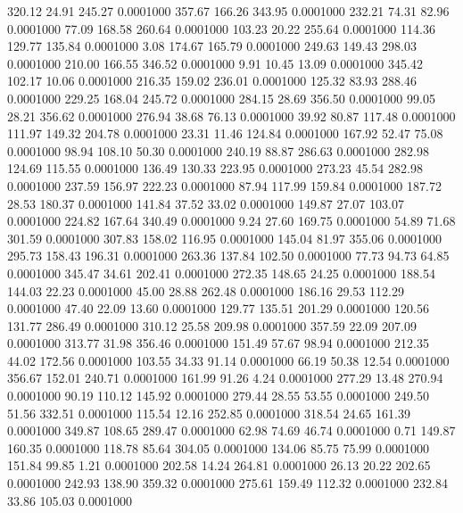  320.12   24.91  245.27   0.0001000
 357.67  166.26  343.95   0.0001000
 232.21   74.31   82.96   0.0001000
  77.09  168.58  260.64   0.0001000
 103.23   20.22  255.64   0.0001000
 114.36  129.77  135.84   0.0001000
   3.08  174.67  165.79   0.0001000
 249.63  149.43  298.03   0.0001000
 210.00  166.55  346.52   0.0001000
   9.91   10.45   13.09   0.0001000
 345.42  102.17   10.06   0.0001000
 216.35  159.02  236.01   0.0001000
 125.32   83.93  288.46   0.0001000
 229.25  168.04  245.72   0.0001000
 284.15   28.69  356.50   0.0001000
  99.05   28.21  356.62   0.0001000
 276.94   38.68   76.13   0.0001000
  39.92   80.87  117.48   0.0001000
 111.97  149.32  204.78   0.0001000
  23.31   11.46  124.84   0.0001000
 167.92   52.47   75.08   0.0001000
  98.94  108.10   50.30   0.0001000
 240.19   88.87  286.63   0.0001000
 282.98  124.69  115.55   0.0001000
 136.49  130.33  223.95   0.0001000
 273.23   45.54  282.98   0.0001000
 237.59  156.97  222.23   0.0001000
  87.94  117.99  159.84   0.0001000
 187.72   28.53  180.37   0.0001000
 141.84   37.52   33.02   0.0001000
 149.87   27.07  103.07   0.0001000
 224.82  167.64  340.49   0.0001000
   9.24   27.60  169.75   0.0001000
  54.89   71.68  301.59   0.0001000
 307.83  158.02  116.95   0.0001000
 145.04   81.97  355.06   0.0001000
 295.73  158.43  196.31   0.0001000
 263.36  137.84  102.50   0.0001000
  77.73   94.73   64.85   0.0001000
 345.47   34.61  202.41   0.0001000
 272.35  148.65   24.25   0.0001000
 188.54  144.03   22.23   0.0001000
  45.00   28.88  262.48   0.0001000
 186.16   29.53  112.29   0.0001000
  47.40   22.09   13.60   0.0001000
 129.77  135.51  201.29   0.0001000
 120.56  131.77  286.49   0.0001000
 310.12   25.58  209.98   0.0001000
 357.59   22.09  207.09   0.0001000
 313.77   31.98  356.46   0.0001000
 151.49   57.67   98.94   0.0001000
 212.35   44.02  172.56   0.0001000
 103.55   34.33   91.14   0.0001000
  66.19   50.38   12.54   0.0001000
 356.67  152.01  240.71   0.0001000
 161.99   91.26    4.24   0.0001000
 277.29   13.48  270.94   0.0001000
  90.19  110.12  145.92   0.0001000
 279.44   28.55   53.55   0.0001000
 249.50   51.56  332.51   0.0001000
 115.54   12.16  252.85   0.0001000
 318.54   24.65  161.39   0.0001000
 349.87  108.65  289.47   0.0001000
  62.98   74.69   46.74   0.0001000
   0.71  149.87  160.35   0.0001000
 118.78   85.64  304.05   0.0001000
 134.06   85.75   75.99   0.0001000
 151.84   99.85    1.21   0.0001000
 202.58   14.24  264.81   0.0001000
  26.13   20.22  202.65   0.0001000
 242.93  138.90  359.32   0.0001000
 275.61  159.49  112.32   0.0001000
 232.84   33.86  105.03   0.0001000
